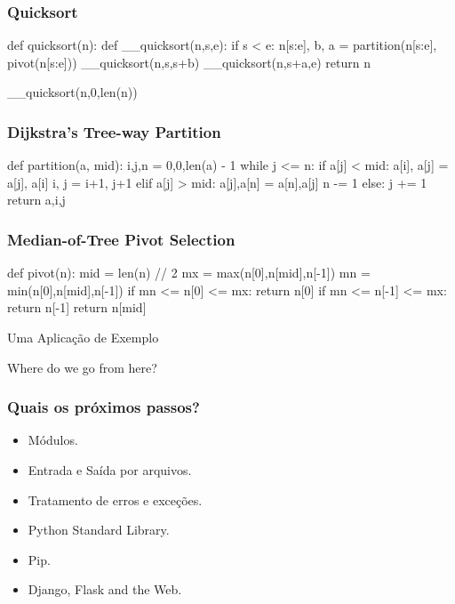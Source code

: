 \documentclass[aspectratio=169,14pt]{beamer}
\begin{document}
\begin{frame}[fragile]
    \frametitle{Quicksort}
    \begin{python}
     def quicksort(n):
         def __quicksort(n,s,e):
             if s <  e:
                 n[s:e], b, a = partition(n[s:e], pivot(n[s:e]))
                 __quicksort(n,s,s+b)
                 __quicksort(n,s+a,e)
             return n

         __quicksort(n,0,len(n))
    \end{python}
\end{frame}

\begin{frame}[fragile]
    \frametitle{Dijkstra's Tree-way Partition}
    \begin{python}
    def partition(a, mid):
        i,j,n = 0,0,len(a) - 1
        while j <= n:
            if a[j] < mid:
                a[i], a[j] = a[j], a[i]
                i, j = i+1, j+1
            elif a[j] > mid:
                a[j],a[n] = a[n],a[j]
                n -= 1
            else: j += 1
        return a,i,j
    \end{python}
\end{frame}

\begin{frame}[fragile]
    \frametitle{Median-of-Tree Pivot Selection}
    \begin{python}
    def pivot(n):
        mid = len(n) // 2
        mx = max(n[0],n[mid],n[-1])
        mn = min(n[0],n[mid],n[-1])
        if mn <= n[0] <= mx: return n[0]
        if mn <= n[-1] <= mx: return n[-1]
        return n[mid]
    \end{python}
\end{frame}

\begin{frame}
    \begin{center}
        \Huge Uma Aplicação de Exemplo
    \end{center}
\end{frame}

\begin{frame}
    \huge{Where do we go from here?}
\end{frame}

\begin{frame}
    \frametitle{Quais os próximos passos?}
    \begin{itemize}[label={}]
        \item Módulos.
        \item Entrada e Saída por arquivos.
        \item Tratamento de erros e exceções.
        \item Python Standard Library.
        \item Pip.
        \item Django, Flask and the Web.
    \end{itemize}
\end{frame}
\end{document}
